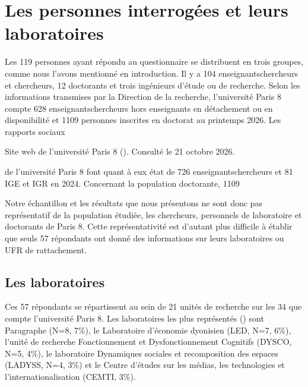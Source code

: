 \documentclass[letterpaper,10pt,english]{jupyterBook}
\begin{document}
\section{Les personnes interrogées et leurs laboratoires}
\label{\detokenize{script_analyse/synthese/main_results:les-personnes-interrogees-et-leurs-laboratoires}}
\sphinxAtStartPar
Les 119 personnes ayant répondu au questionnaire se distribuent en trois groupes, comme nous l’avons mentionné en introduction. Il y a 104 enseignants\sphinxhyphen{}chercheurs et chercheurs, 12 doctorants et trois ingénieurs d’étude ou de recherche. Selon les informations transmises par la Direction de la recherche, l’université Paris 8 compte 628 enseignants\sphinxhyphen{}chercheurs hors enseignants en détachement ou en disponibilité et 1109 personnes inscrites en doctorat au printemps 2026. Les rapports sociaux%
\begin{footnote}[1]\sphinxAtStartFootnote
Site web de l’université Paris 8 (). Consulté le 21 octobre 2026.
%
\end{footnote} de l’université Paris 8 font quant à eux état de 726 enseignants\sphinxhyphen{}chercheurs et 81 IGE et IGR en 2024. Concernant la population doctorante, 1109

\sphinxAtStartPar
Notre échantillon et les résultats que nous présentons ne sont donc pas représentatif de la population étudiée,  les chercheurs, personnels de laboratoire et doctorants de Paris 8. Cette représentativité est d’autant plus difficile à établir que seuls 57 répondants ont donné des informations sur leurs laboratoires ou UFR de rattachement.


\subsection{Les laboratoires}
\label{\detokenize{script_analyse/synthese/main_results:les-laboratoires}}
\sphinxAtStartPar
Ces 57 répondants se répartissent au sein de 21 unités de recherche sur les 34 que compte l’université Paris 8. Les laboratoires les plus représentés () sont Paragraphe (N=8, 7\%), le Laboratoire d’économie dyonisien (LED, N=7, 6\%), l’unité de recherche Fonctionnement et Dysfonctionnement Cognitifs (DYSCO, N=5, 4\%), le  laboratoire Dynamiques sociales et recomposition des espaces (LADYSS, N=4, 3\%) et le Centre d’études sur les médias, les technologies et l’internationalisation (CEMTI, 3\%).
\end{document}
